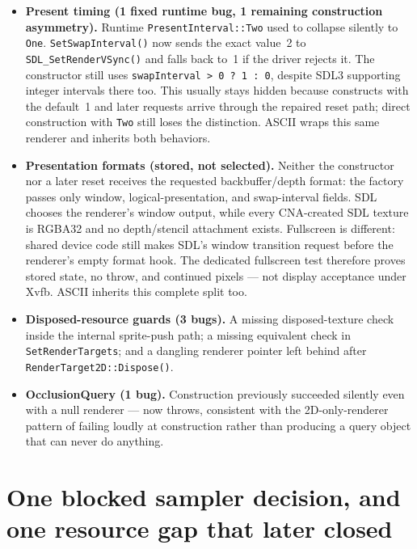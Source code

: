 \begin{itemize}
        proves the first two with pixels, but its ``every bind'' wording omits CNA's divergence
        from FNA: a redundant bind clears again here, while FNA returns early.
  \item \textbf{Present timing (1 fixed runtime bug, 1 remaining construction asymmetry).}
        Runtime \texttt{PresentInterval::Two} used to collapse silently to
        \texttt{One}. \texttt{SetSwapInterval()} now sends the exact value~2 to
        \texttt{SDL\_SetRenderVSync()} and falls back to~1 if the driver rejects it. The
        constructor still uses \texttt{swapInterval > 0 ? 1 : 0}, despite SDL3 supporting
        integer intervals there too. This usually stays hidden because 
        constructs with the default~1 and later requests arrive through the repaired reset
        path; direct  construction with \texttt{Two} still loses the
        distinction. ASCII wraps this same renderer and inherits both behaviors.
  \item \textbf{Presentation formats (stored, not selected).} Neither the constructor nor a
        later reset receives the requested backbuffer/depth format: the factory passes only
        window, logical-presentation, and swap-interval fields. SDL chooses the renderer's
        window output, while every CNA-created SDL texture is RGBA32 and no depth/stencil
        attachment exists. Fullscreen is different: shared device code still makes SDL's
        window transition request before the renderer's empty format hook.
        The dedicated fullscreen test therefore proves stored state, no throw, and continued
        pixels --- not display acceptance under Xvfb. ASCII inherits this complete split too.
  \item \textbf{Disposed-resource guards (3 bugs).} A missing disposed-texture check inside
        the internal sprite-push path; a missing equivalent check in
        \texttt{SetRenderTargets}; and a dangling renderer pointer left behind after
        \texttt{RenderTarget2D::Dispose()}.
  \item \textbf{OcclusionQuery (1 bug).} Construction previously succeeded silently even with
        a null renderer --- now throws, consistent with the 2D-only-renderer pattern of
        failing loudly at construction rather than producing a query object that can never
        do anything.
\end{itemize}

\section{One blocked sampler decision, and one resource gap that later closed}

